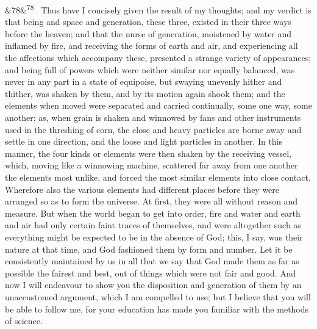\documentclass[12pt]{article}
\newcommand{\para}[1][]{\par\noindent\ifx&#1&\else\textsuperscript{\footnotesize #1}~\fi}
\begin{document}
\para[78] Thus have I concisely given the result of my thoughts; and my verdict is that being and space and generation, these three, existed in their three ways before the heaven; and that the nurse of generation, moistened by water and inflamed by fire, and receiving the forms of earth and air, and experiencing all the affections which accompany these, presented a strange variety of appearances; and being full of powers which were neither similar nor equally balanced, was never in any part in a state of equipoise, but swaying unevenly hither and thither, was shaken by them, and by its motion again shook them; and the elements when moved were separated and carried continually, some one way, some another; as, when grain is shaken and winnowed by fans and other instruments used in the threshing of corn, the close and heavy particles are borne away and settle in one direction, and the loose and light particles in another. In this manner, the four kinds or elements were then shaken by the receiving vessel, which, moving like a winnowing machine, scattered far away from one another the elements most unlike, and forced the most similar elements into close contact. Wherefore also the various elements had different places before they were arranged so as to form the universe. At first, they were all without reason and measure. But when the world began to get into order, fire and water and earth and air had only certain faint traces of themselves, and were altogether such as everything might be expected to be in the absence of God; this, I say, was their nature at that time, and God fashioned them by form and number. Let it be consistently maintained by us in all that we say that God made them as far as possible the fairest and best, out of things which were not fair and good. And now I will endeavour to show you the disposition and generation of them by an unaccustomed argument, which I am compelled to use; but I believe that you will be able to follow me, for your education has made you familiar with the methods of science.
\end{document}
